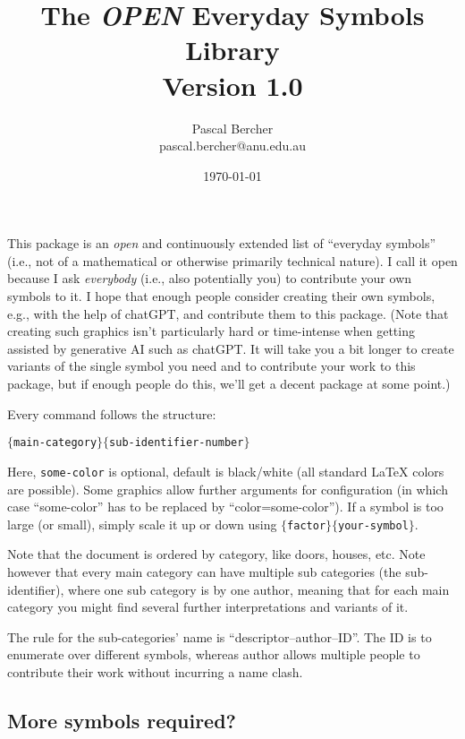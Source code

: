 \documentclass{article}
\begin{document}
\title{The \emph{OPEN} Everyday Symbols Library\\[1ex]\large Version 1.0}
\author{Pascal Bercher\\pascal.bercher@anu.edu.au}
\date{\today}

\maketitle

\setlength{\parindent}{0pt}

This package is an \emph{open} and continuously extended list of ``everyday symbols'' (i.e., not of a mathematical or otherwise primarily technical nature). I call it open because I ask \emph{everybody} (i.e., also potentially you) to contribute your own symbols to it. I hope that enough people consider creating their own symbols, e.g., with the help of chatGPT, and contribute them to this package. (Note that creating such graphics isn't particularly hard or time-intense when getting assisted by generative AI such as chatGPT. It will take you a bit longer to create variants of the single symbol you need and to contribute your work to this package, but if enough people do this, we'll get a decent package at some point.)

\medskip
Every command follows the structure:
\begin{center}
  \texttt{\string{}$\{$main-category$\}\{$sub-identifier-number$\}$}
\end{center}
Here, \texttt{some-color} is optional, default is black/white (all standard \LaTeX{} colors are possible). Some graphics allow further arguments for configuration (in which case ``some-color'' has to be replaced by ``color=some-color''). If a symbol is too large (or small), simply scale it up or down using
\texttt{\string\scalebox$\{$factor$\}\{$your-symbol$\}$}.

\medskip
Note that the document is ordered by category, like doors, houses, etc. Note however that every main category can have multiple sub categories (the sub-identifier), where one sub category is by one author, meaning that for each main category you might find several further interpretations and variants of it. 

\medskip
The rule for the sub-categories' name is ``descriptor--author--ID''. The ID is to enumerate over different symbols, whereas author allows multiple people to contribute their work without incurring a name clash.

\subsection*{More symbols required?}
\end{document}

